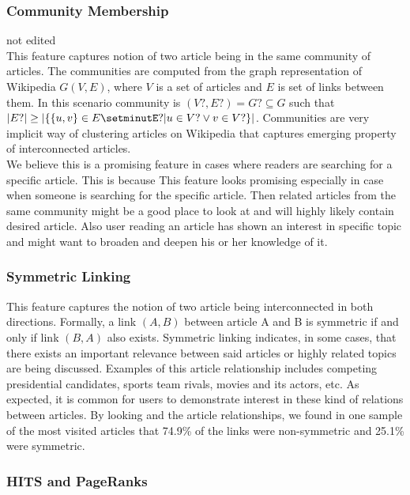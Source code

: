 \subsubsection{Community Membership}
not edited \\
This feature captures notion of two article being in the same community of articles. The communities are computed from the graph representation of Wikipedia $G(V,E)$, where $V$ is a set of articles and $E$ is set of links between them. In this scenario community is $(V?, E?) = G? \subseteq G$ such that $|E?| \ge |\{ \{u,v\} \in E\setminutE? | u \in V? \vee v \in V? \}|$. Communities are very implicit way of clustering articles on Wikipedia that captures emerging property of interconnected articles.  \\

We believe this is a promising feature in cases where readers are searching for a specific article. This is because
This feature looks promising especially in case when someone is searching for the specific article. Then related articles from the same community might be a good place to look at and will highly likely contain desired article. Also user reading an article has shown an interest in specific topic and might want to broaden and deepen his or her knowledge of it.

\subsubsection{Symmetric Linking}
This feature captures the notion of two article being interconnected in both directions. Formally, a link $(A,B)$ between article A and B is symmetric if and only if link $(B,A)$ also exists. Symmetric linking indicates, in some cases, that there exists an important relevance between said articles or highly related topics are being discussed. Examples of this article relationship includes competing presidential candidates, sports team rivals, movies and its actors, etc. As expected, it is common for users to demonstrate interest in these kind of relations between articles. By looking and the article relationships, we found in one sample of the most visited articles that 74.9\% of the links were non-symmetric and 25.1\% were symmetric.

\subsubsection{HITS and PageRanks}


\lipsum[4] %
